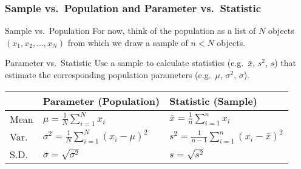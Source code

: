 \begin{frame}

\frametitle{Sample vs.\ Population and Parameter vs.\ Statistic}

\begin{block}{Sample vs.\ Population}
  For now, think of the \alert{population} as a list of $N$ objects
  $(x_1, x_2, \hdots, x_N)$ from which we draw a \alert{sample} of $n<N$ objects.
\end{block}

\begin{block}{Parameter vs.\ Statistic}
  Use a sample to calculate \alert{statistics} (e.g.\ $\bar{x}$, $s^2$, $s$) that estimate the corresponding population \alert{parameters} (e.g.\ $\mu$, $\sigma^2$, $\sigma$).
\end{block}

\vspace{1em}
\small
\begin{tabular}{l|l|l}
	&\textbf{Parameter} (Population)&\textbf{Statistic} (Sample)\\
	\hline
	Mean&$\displaystyle\mu = \frac{1}{N} \sum_{i=1}^N x_i$& $\displaystyle\bar{x} = \frac{1}{n} \sum_{i=1}^n x_i$ \\
	Var.\ &$\displaystyle \sigma^2 = \frac{1}{N}\sum_{i=1}^N (x_i - \mu)^2$ &$\displaystyle s^2 = \frac{1}{n-1}\sum_{i=1}^n(x_i - \bar{x})^2$\\
	S.D.\ &$\sigma = \sqrt{\sigma^2}$ &$s = \sqrt{s^2}$
\end{tabular}

\end{frame}
%
%
